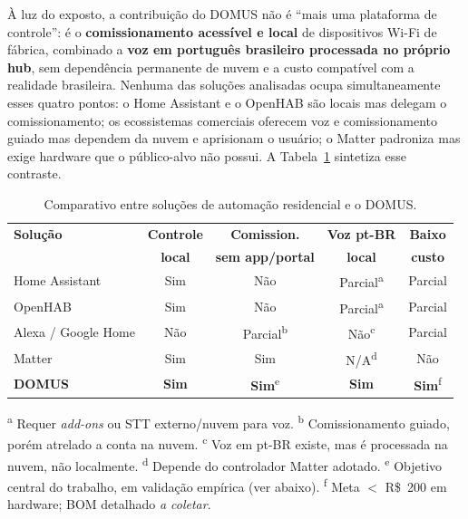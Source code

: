 À luz do exposto, a contribuição do DOMUS não é ``mais uma plataforma de
controle'': é o \textbf{comissionamento acessível e local} de dispositivos Wi-Fi
de fábrica, combinado a \textbf{voz em português brasileiro processada no próprio
hub}, sem dependência permanente de nuvem e a custo compatível com a realidade
brasileira. Nenhuma das soluções analisadas ocupa simultaneamente esses quatro
pontos: o Home Assistant e o OpenHAB são locais mas delegam o comissionamento; os
ecossistemas comerciais oferecem voz e comissionamento guiado mas dependem da
nuvem e aprisionam o usuário; o Matter padroniza mas exige hardware que o
público-alvo não possui. A Tabela~\ref{tab:comparativo} sintetiza esse contraste.

\begin{table}[H]
\centering
\caption{Comparativo entre soluções de automação residencial e o DOMUS.}
\label{tab:comparativo}
\begin{tabular}{@{}lcccc@{}}
\toprule
\textbf{Solução} & \textbf{Controle} & \textbf{Comission.} & \textbf{Voz pt-BR} & \textbf{Baixo} \\
                 & \textbf{local}    & \textbf{sem app/portal} & \textbf{local} & \textbf{custo} \\
\midrule
Home Assistant          & Sim     & Não     & Parcial\textsuperscript{a} & Parcial \\
OpenHAB                 & Sim     & Não     & Parcial\textsuperscript{a} & Parcial \\
Alexa / Google Home     & Não     & Parcial\textsuperscript{b} & Não\textsuperscript{c} & Parcial \\
Matter                  & Sim     & Sim     & N/A\textsuperscript{d}     & Não \\
\textbf{DOMUS}          & \textbf{Sim} & \textbf{Sim}\textsuperscript{e} & \textbf{Sim} & \textbf{Sim}\textsuperscript{f} \\
\bottomrule
\end{tabular}

\vspace{0.3em}
{\footnotesize
\begin{flushleft}
\textsuperscript{a} Requer \textit{add-ons} ou STT externo/nuvem para voz.
\textsuperscript{b} Comissionamento guiado, porém atrelado a conta na nuvem.
\textsuperscript{c} Voz em pt-BR existe, mas é processada na nuvem, não localmente.
\textsuperscript{d} Depende do controlador Matter adotado.
\textsuperscript{e} Objetivo central do trabalho, em validação empírica (ver abaixo).
\textsuperscript{f} Meta $<$ R\$~200 em hardware; BOM detalhado \textit{a coletar}.
\end{flushleft}}
\end{table}

